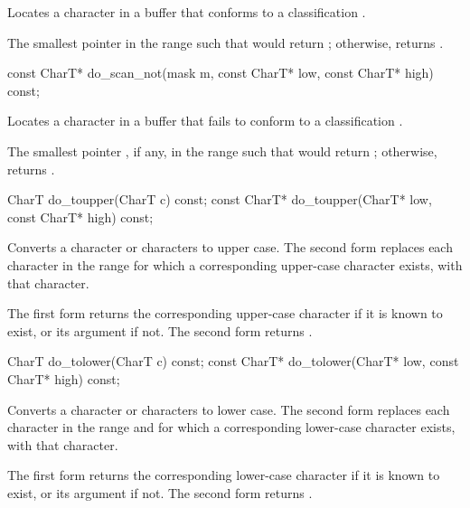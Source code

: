 \begin{itemdescr}
\pnum
\effects
Locates a character in a buffer that conforms to a classification .

\pnum
\returns
The smallest pointer  in the range 
such that  would return ;
otherwise, returns .
\end{itemdescr}

%
\begin{itemdecl}
const CharT* do_scan_not(mask m, const CharT* low, const CharT* high) const;
\end{itemdecl}

\begin{itemdescr}
\pnum
\effects
Locates a character in a buffer that fails to conform to a classification
.

\pnum
\returns
The smallest pointer , if any, in the range 
such that  would return ;
otherwise, returns .
\end{itemdescr}

%
\begin{itemdecl}
CharT        do_toupper(CharT c) const;
const CharT* do_toupper(CharT* low, const CharT* high) const;
\end{itemdecl}

\begin{itemdescr}
\pnum
\effects
Converts a character or characters to upper case.
The second form replaces
each character  in the range 
for which a corresponding upper-case character exists,
with that character.

\pnum
\returns
The first form returns
the corresponding upper-case character if it is known to exist, or
its argument if not.
The second form returns .
\end{itemdescr}

%
\begin{itemdecl}
CharT        do_tolower(CharT c) const;
const CharT* do_tolower(CharT* low, const CharT* high) const;
\end{itemdecl}

\begin{itemdescr}
\pnum
\effects
Converts a character or characters to lower case.
The second form replaces
each character  in the range 
and for which a corresponding lower-case character exists,
with that character.

\pnum
\returns
The first form returns
the corresponding lower-case character if it is known to exist, or
its argument if not.
The second form returns .
\end{itemdescr}

